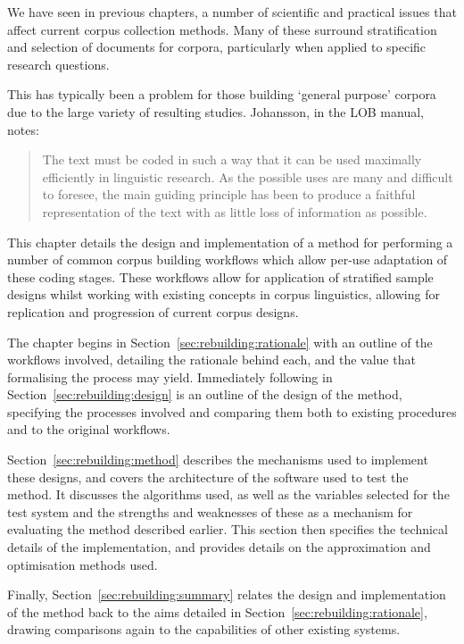 

We have seen in previous chapters, a number of scientific and practical issues that affect current corpus collection methods.  Many of these surround stratification and selection of documents for corpora, particularly when applied to specific research questions.

This has typically been a problem for those building `general purpose' corpora due to the large variety of resulting studies.  Johansson, in the LOB manual\cite{johansson1986tagged}, notes:

\begin{quote}
The text must be coded in such a way that it can be used maximally efficiently in linguistic research. As the possible uses are many and difficult to foresee, the main guiding principle has been to produce a faithful representation of the text with as little loss of information as possible.
\end{quote}


This chapter details the design and implementation of a method for performing a number of common corpus building workflows which allow per-use adaptation of these coding stages.  These workflows allow for application of stratified sample designs whilst working with existing concepts in corpus linguistics, allowing for replication and progression of current corpus designs.

The chapter begins in Section~\ref{sec:rebuilding:rationale} with an outline of the workflows involved, detailing the rationale behind each, and the value that formalising the process may yield.  Immediately following in Section~\ref{sec:rebuilding:design} is an outline of the design of the method, specifying the processes involved and comparing them both to existing procedures and to the original workflows.

Section~\ref{sec:rebuilding:method} describes the mechanisms used to implement these designs, and covers the architecture of the software used to test the method.  It discusses the algorithms used, as well as the variables selected for the test system and the strengths and weaknesses of these as a mechanism for evaluating the method described earlier.  This section then specifies the technical details of the implementation, and provides details on the approximation and optimisation methods used.  

Finally, Section~\ref{sec:rebuilding:summary} relates the design and implementation of the method back to the aims detailed in Section~\ref{sec:rebuilding:rationale}, drawing comparisons again to the capabilities of other existing systems.

